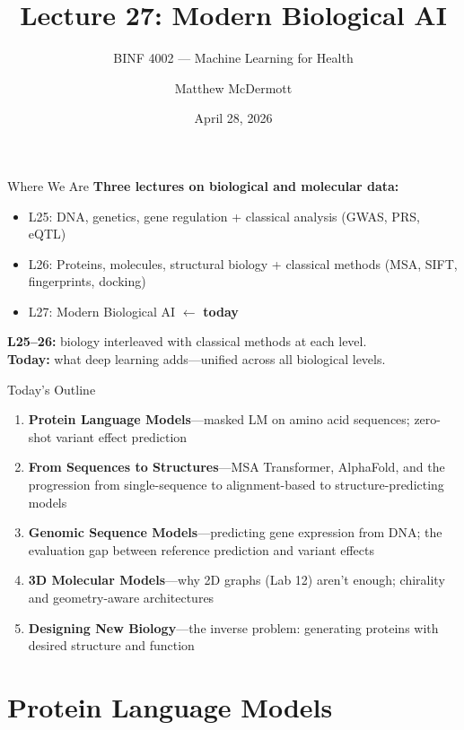 \documentclass[aspectratio=169,10pt]{beamer}
\title{Lecture 27: Modern Biological AI}
\subtitle{BINF 4002 --- Machine Learning for Health}
\author{Matthew McDermott}
\institute{Dept.\ of Biomedical Informatics, Columbia University}
\date{April 28, 2026}
\begin{document}
\begin{frame}[noframenumbering]\maketitle\end{frame}

\begin{frame}{Where We Are}
\textbf{Three lectures on biological and molecular data:}
\begin{itemize}
    \item[\textcolor{columbiagray}{$\bullet$}] L25: DNA, genetics, gene regulation + classical analysis (GWAS, PRS, eQTL)
    \item[\textcolor{columbiagray}{$\bullet$}] L26: Proteins, molecules, structural biology + classical methods (MSA, SIFT, fingerprints, docking)
    \item[\textcolor{columbiaaccent}{$\to$}] \alert{L27: Modern Biological AI} $\gets$ \textbf{today}
\end{itemize}
\vspace{0.3em}
\textbf{L25--26:} biology interleaved with classical methods at each level.\\
\textbf{Today:} what deep learning adds---unified across all biological levels.
\end{frame}

\begin{frame}{Today's Outline}
\begin{enumerate}
    \item \textbf{Protein Language Models}---masked LM on amino acid sequences; zero-shot variant effect prediction
    \item \textbf{From Sequences to Structures}---MSA Transformer, AlphaFold, and the progression from single-sequence to alignment-based to structure-predicting models
    \item \textbf{Genomic Sequence Models}---predicting gene expression from DNA; the evaluation gap between reference prediction and variant effects
    \item \textbf{3D Molecular Models}---why 2D graphs (Lab 12) aren't enough; chirality and geometry-aware architectures
    \item \textbf{Designing New Biology}---the inverse problem: generating proteins with desired structure and function
\end{enumerate}
\end{frame}

\section{Protein Language Models}
\end{document}
